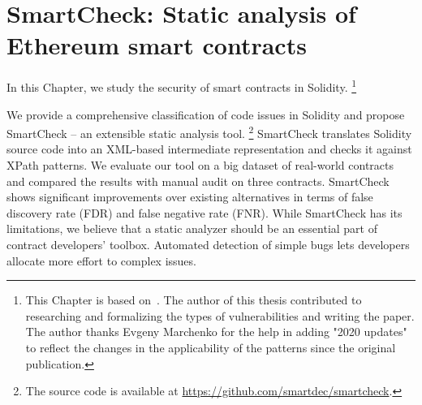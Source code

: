 \chapter{SmartCheck: Static analysis of Ethereum smart contracts}

\label{Chapter11SmartCheck}



In this Chapter, we study the security of smart contracts in Solidity.
\footnote{This Chapter is based on~\cite{Tikhomirov2018}. The author of this thesis contributed to researching and formalizing the types of vulnerabilities and writing the paper. The author thanks Evgeny Marchenko for the help in adding "2020 updates" to reflect the changes in the applicability of the patterns since the original publication.}

We provide a comprehensive classification of code issues in Solidity and propose SmartCheck -- an extensible static analysis tool.
\footnote{The source code is available at \url{https://github.com/smartdec/smartcheck}.}
SmartCheck translates Solidity source code into an XML-based intermediate representation and checks it against XPath patterns.
We evaluate our tool on a big dataset of real-world contracts and compared the results with manual audit on three contracts.
SmartCheck shows significant improvements over existing alternatives in terms of false discovery rate (FDR) and false negative rate (FNR).
While SmartCheck has its limitations, we believe that a static analyzer should be an essential part of contract developers' toolbox.
Automated detection of simple bugs lets developers allocate more effort to complex issues.



%










